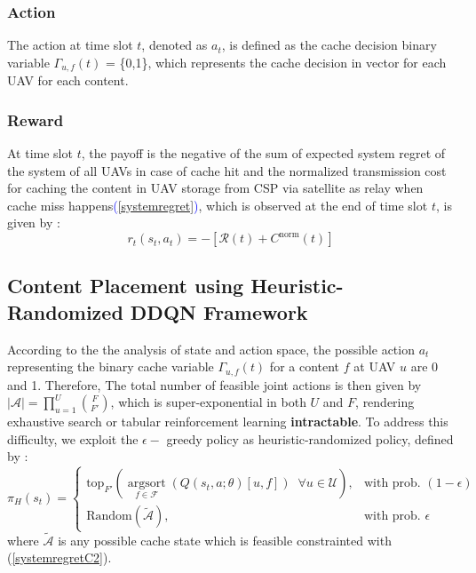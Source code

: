 \documentclass[journal]{IEEEtran}
\begin{document}
\subsubsection{Action} 
The action at time slot \( t \), denoted as \( a_t \), is defined as the cache decision binary variable \( \Gamma_{u,f}(t) \) = \{0,1\}, which represents the cache decision in vector for each UAV for each content.


\subsubsection{Reward} 
At time slot \( t \), the payoff is the negative of the sum of expected system regret of the system of all UAVs in case of cache hit and the normalized transmission cost for caching the content in UAV storage from CSP via satellite as relay when cache miss happens\textcolor{blue}{(\ref{systemregret})}, which is observed at the end of time slot \( t \), is given by :
\begin{equation}
r_t(s_t, a_t) = - [ \mathcal{R}(t) +  {C}^{\text{norm}}(t) ]
\label{reward_drl}
\end{equation}



\subsection{Content Placement using Heuristic-Randomized DDQN Framework}

According to the the analysis of state and action space, the possible action $a_t$ representing the binary cache variable $\Gamma_{u,f}(t)$ for a content $f$ at UAV $u$ are 0 and 1. Therefore, The total number of feasible joint actions is then given by $|\mathcal{A}| = \prod_{u=1}^{U} \binom{F}{F'}$, which is super-exponential in both $U$ and $F$, rendering exhaustive search or tabular reinforcement learning \textbf{intractable}\cite{10717449}. To address this difficulty, we exploit the $\epsilon-$ greedy policy as heuristic-randomized policy, defined by \cite{9177109} : 
\begin{equation}
    \pi_{H}(s_t) = 
    \begin{cases}
        \text{top}_{F'}\left( \underset{f \in \mathcal{F}}{\operatorname{arg sort}} \left( Q(s_t, a; \theta)[u, f] \right) \;\; \forall u \in \mathcal{U} \right), & \text{with prob. } (1 - \epsilon) \\
        \text{Random}(\tilde{\mathcal{A}}), & \text{with prob. } \epsilon
    \end{cases}
    \label{eq:heuristic_policy}
\end{equation}
where $\tilde{\mathcal{A}}$ is any possible cache state which is feasible constrainted with (\ref{systemregretC2}).
\end{document}
